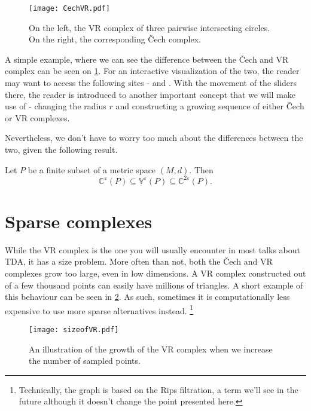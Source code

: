 \begin{figure}[h!]
  \centering
  \texttt{[image: CechVR.pdf]}
  \caption{On the left, the VR complex of three pairwise intersecting circles. On the right, the corresponding Čech complex.}
  \label{fig:CechVR}
\end{figure}

A simple example, where we can see the difference between the Čech and VR complex can be seen on \ref{fig:CechVR}. For an interactive visualization of the two, the reader may want to access the following sites - \cite{smajhiVietorisx2013RipsComplex} and \cite{saulnechComplex}. With the movement of the sliders there, the reader is introduced to another important concept that we will make use of - changing the radius $r$ and constructing a growing sequence of either Čech or VR complexes.

Nevertheless, we don't have to worry too much about the differences between the two, given the following result.

\begin{theorem}
  Let $P$ be a finite subset of a metric space $(M,d)$. Then
  \begin{equation}
    \mathbb{C}^{\varepsilon}(P) \subseteq \mathbb{V}^{\varepsilon}(P) \subseteq \mathbb{C}^{2\varepsilon}(P).
  \end{equation}
\end{theorem}

\section{Sparse complexes}

While the VR complex is the one you will usually encounter in most talks about TDA, it has a size problem. More often than not, both the Čech and VR complexes grow too large, even in low dimensions. A VR complex constructed out of a few thousand points can easily have millions of triangles. A short example of this behaviour can be seen in \ref{fig:sizeofVR}. As such, sometimes it is computationally less expensive to use more sparse alternatives instead. \footnote{Technically, the graph is based on the Rips filtration, a term we'll see in the future although it doesn't change the point presented here.}

\begin{figure}[h!]
  \centering
  \texttt{[image: sizeofVR.pdf]}
  \caption{An illustration of the growth of the VR complex when we increase the number of sampled points.}
  \label{fig:sizeofVR}
\end{figure}

